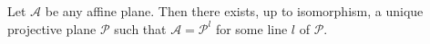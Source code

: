 Let $\mathcal{A}$ be any affine plane. Then there exists, up to isomorphism, a unique projective plane $\mathcal{P}$ such that $\mathcal{A} = \mathcal{P}^l$ for some line $l$ of $\mathcal{P}$.
